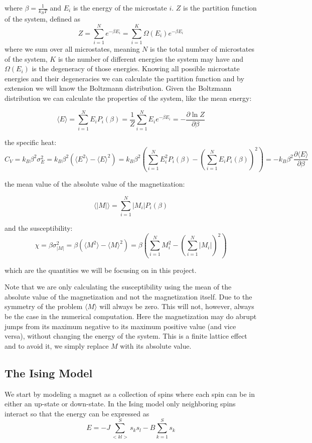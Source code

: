 \documentclass[english, 12pt]{article}
\newcommand{\f}{\frac}
\begin{document}
where $\beta = \f{1}{k_BT}$ and $E_i$ is the energy of the microstate $i$. $Z$ is the partition function of the system, defined as
$$Z = \sum\limits_{i=1}^Ne^{-\beta E_i} = \sum\limits_{i=1}^K\Omega(E_i)e^{-\beta E_i}$$
where we sum over all microstates, meaning $N$ is the total number of microstates of the system, $K$ is the number of different energies the system may have and $\Omega(E_i)$ is the degeneracy of those energies. Knowing all possible microstate energies and their degeneracies we can calculate the partition function and by extension we will know the Boltzmann distribution. Given the Boltzmann distribution we can calculate the properties of the system, like the mean energy:

$$\langle E\rangle = \sum\limits_{i=1}^NE_iP_i(\beta) = \f{1}{Z}\sum\limits_{i=1}^NE_ie^{-\beta E_i} = -\f{\partial \ln Z}{\partial \beta}$$


the specific heat:
$$C_V = k_B\beta^2\sigma_E^2 = k_B\beta^2(\langle E^2\rangle-\langle E\rangle^2) =  k_B\beta^2\left(\sum\limits_{i=1}^NE_i^2P_i(\beta) - \left(\sum\limits_{i=1}^NE_iP_i(\beta)\right)^2\right) = -k_B\beta^2\f{\partial \langle E\rangle}{\partial \beta}$$

the  mean value of the absolute value of the magnetization:

$$\langle |M|\rangle = \sum\limits_{i=1}^N|M_i|P_i(\beta)$$

and the susceptibility:
$$\chi = \beta\sigma_{|M|}^2 =\beta(\langle M^2\rangle - \langle M\rangle^2) =  \beta\left(\sum\limits_{i=1}^NM_i^2 - \left(\sum\limits_{i=1}^N|M_i|\right)^2\right)$$

which are the quantities we will be focusing on in this project.

Note that we are only calculating the susceptibility using the mean of the absolute value of the magnetization and not the magnetization itself. Due to the symmetry of the problem $\langle M\rangle$ will always be zero. This will not, however, always be the case in the numerical computation. Here the magnetization may do abrupt jumps from its maximum negative to its maximum positive value (and vice versa), without changing the energy of the system. This is a finite lattice effect and to avoid it, we simply replace $M$ with its absolute value.

\subsection{The Ising Model}
We start by modeling a magnet as a collection of spins where each spin can be in either an up-state or down-state.
In the Ising model only neighboring spins interact so that the energy can be expressed as
$$E = -J\sum\limits_{<kl>}^Ss_ks_l - B\sum_{k=1}^{S}s_k$$
\end{document}

